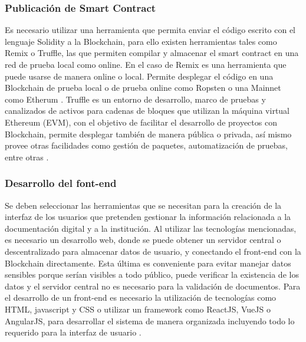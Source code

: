 \subsubsection{Publicación de Smart Contract}
Es necesario utilizar una herramienta  que permita enviar el código escrito con el lenguaje Solidity a la Blockchain, para 
ello existen herramientas tales como Remix o Truffle, las que permiten compilar y almacenar el smart contract en una red de prueba local como online.
En el caso de Remix es una herramienta que puede usarse de manera online o local. Permite desplegar el código en una  Blockchain de prueba local o 
de prueba online como Ropsten o una Mainnet como Etherum \cite[]{remix_deploy_nodate}.
 Truffle es un entorno de desarrollo, marco de pruebas y canalizados de activos para cadenas de bloques que utilizan la máquina virtual Ethereum (EVM), con el objetivo de facilitar el desarrollo
de proyectos con Blockchain, permite desplegar también de manera pública o privada, así mismo provee otras facilidades como gestión de paquetes,
automatización de pruebas, entre otras \cite[]{truffle_truffle_nodate}. 






\subsubsection{Desarrollo del font-end}
Se deben seleccionar las  herramientas que se necesitan para la creación de la interfaz de los usuarios 
que pretenden gestionar la información relacionada a la documentación digital y a la institución.
Al utilizar las tecnologías mencionadas, es necesario  un desarrollo web, donde se puede obtener  un servidor central o descentralizado
para almacenar datos de usuario, y conectando 
el front-end con la  Blockchain directamente. Esta última es conveniente para evitar manejar datos sensibles 
porque serían visibles a todo público, puede verificar la existencia de los datos y 
el servidor central no es necesario para la validación de documentos.
Para el desarrollo de un front-end es necesario la utilización de  tecnologías como  HTML, javascript y CSS o utilizar un framework como
ReactJS, VueJS o AngularJS, para desarrollar el sistema de manera organizada incluyendo todo lo requerido para la interfaz de usuario \cite[]{dannen_introducing_2017,educacionit_carrera_nodate}.

